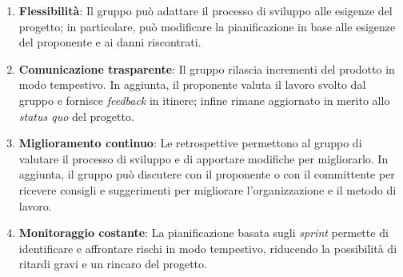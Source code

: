 \begin{enumerate}
	\item \textbf{Flessibilità}: Il gruppo può adattare il processo di sviluppo
	      alle esigenze del progetto; in particolare, può modificare la
	      pianificazione in base alle esigenze del proponente e ai danni
	      riscontrati.

	\item \textbf{Comunicazione trasparente}: Il gruppo rilascia incrementi del
	      prodotto in modo tempestivo. In aggiunta, il proponente valuta il
	      lavoro svolto dal gruppo e fornisce \textit{feedback} in itinere;
	      infine rimane aggiornato in merito allo \textit{status quo} del
	      progetto.

	\item \textbf{Miglioramento continuo}: Le retrospettive permettono al
	      gruppo di valutare il processo di sviluppo e di apportare
	      modifiche per migliorarlo. In aggiunta, il gruppo può
	      discutere con il proponente o con il committente per ricevere consigli
	      e suggerimenti per migliorare l'organizzazione e il metodo di lavoro.

	\item \textbf{Monitoraggio costante}: La pianificazione basata sugli
	      \textit{sprint} permette di identificare e affrontare rischi in modo
	      tempestivo, riducendo la possibilità di ritardi gravi e un rincaro del
	      progetto.
\end{enumerate}
